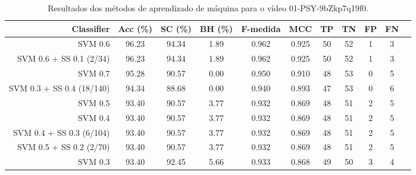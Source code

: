 \begin{table}[!htb]
\centering
\caption{Resultados dos métodos de aprendizado de máquina para o vídeo 01-PSY-9bZkp7q19f0.}
\label{tab:01-PSY-9bZkp7q19f0}
\begin{tabular}{r|c|c|c|c|c|c|c|c|c|c}
\hline\hline
Classifier & Acc (\%) & SC (\%) & BH (\%) & F-medida & MCC & TP & TN & FP & FN \\ \hline
SVM 0.6 & 96.23 & 94.34 & 1.89 & 0.962 & 0.925 & 50 & 52 & 1 & 3 \\ 
SVM 0.6 + SS 0.1 (2/34) & 96.23 & 94.34 & 1.89 & 0.962 & 0.925 & 50 & 52 & 1 & 3 \\ 
SVM 0.7 & 95.28 & 90.57 & 0.00 & 0.950 & 0.910 & 48 & 53 & 0 & 5 \\ 
SVM 0.3 + SS 0.4 (18/140) & 94.34 & 88.68 & 0.00 & 0.940 & 0.893 & 47 & 53 & 0 & 6 \\ 
SVM 0.5 & 93.40 & 90.57 & 3.77 & 0.932 & 0.869 & 48 & 51 & 2 & 5 \\ 
SVM 0.4 & 93.40 & 90.57 & 3.77 & 0.932 & 0.869 & 48 & 51 & 2 & 5 \\ 
SVM 0.4 + SS 0.3 (6/104) & 93.40 & 90.57 & 3.77 & 0.932 & 0.869 & 48 & 51 & 2 & 5 \\ 
SVM 0.5 + SS 0.2 (2/70) & 93.40 & 90.57 & 3.77 & 0.932 & 0.869 & 48 & 51 & 2 & 5 \\ 
SVM 0.3 & 93.40 & 92.45 & 5.66 & 0.933 & 0.868 & 49 & 50 & 3 & 4 \\ 
\hline\hline
\end{tabular}
\end{table}
